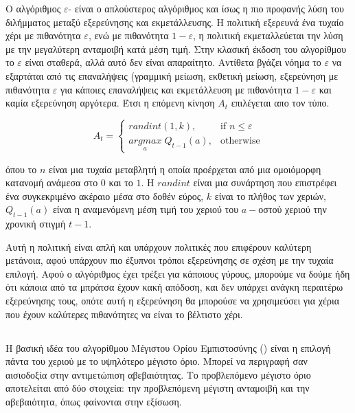 Ο αλγόριθμος $ε$- είναι ο απλούστερος αλγόριθμος και ίσως η πιο προφανής λύση του διλήμματος μεταξύ εξερεύνησης και εκμετάλλευσης. Η πολιτική εξερευνά ένα τυχαίο χέρι με πιθανότητα $ε$, ενώ με πιθανότητα $1-ε$, η πολιτική εκμεταλλεύεται την λύση με την μεγαλύτερη ανταμοιβή κατά μέση τιμή. Στην κλασική έκδοση του αλγορίθμου το $ε$ είναι σταθερά, αλλά αυτό δεν είναι απαραίτητο. Αντίθετα βγάζει νόημα το $ε$ να εξαρτάται από τις επαναλήψεις (γραμμική μείωση, εκθετική μείωση, εξερεύνηση με πιθανότητα $ε$ για κάποιες επαναλήψεις και εκμετάλλευση με πιθανότητα $1-ε$ και καμία εξερεύνηση αργότερα. Έτσι η επόμενη κίνηση $A_t$ επιλέγεται απο τον τύπο.

\begin{otherlanguage}{english}
    \begin{equation*}
        A_t = \begin{cases}
            randint(1,k),                     & \text{if } n \leq ε \\
            \underset{a}{argmax}\;Q_{t-1}(a), & \text{otherwise}
        \end{cases}
    \end{equation*}
\end{otherlanguage}

όπου το $n$ είναι μια τυχαία μεταβλητή η οποία προέρχεται από μια ομοιόμορφη κατανομή ανάμεσα στο $0$ και το $1$. Η $randint$ είναι μια συνάρτηση που επιστρέφει ένα συγκεκριμένο ακέραιο μέσα στο δοθέν εύρος, $k$ είναι το πλήθος των χεριών, $Q_{t-1}(a)$ είναι η αναμενόμενη μέση τιμή του χεριού του $a-$οστού χεριού την χρονική στιγμή $t-1$.

Αυτή η πολιτική είναι απλή και υπάρχουν πολιτικές που επιφέρουν καλύτερη μετάνοια, αφού υπάρχουν πιο έξυπνοι τρόποι εξερεύνησης σε σχέση με την τυχαία επιλογή. Αφού ο αλγόριθμος έχει τρέξει για κάποιους γύρους, μπορούμε να δούμε ήδη ότι κάποια από τα μπράτσα έχουν κακή απόδοση, και δεν υπάρχει ανάγκη περαιτέρω εξερεύνησης τους, οπότε αυτή η εξερεύνηση θα μπορούσε να χρησιμεύσει για χέρια που έχουν καλύτερες πιθανότητες να είναι το βέλτιστο χέρι.

\subsection{}

Η βασική ιδέα του αλγορίθμου Μέγιστου Ορίου Εμπιστοσύνης () είναι η επιλογή πάντα του χεριού με το υψηλότερο μέγιστο όριο. Μπορεί να περιγραφή σαν αισιοδοξία στην αντιμετώπιση αβεβαιότητας. Το προβλεπόμενο μέγιστο όριο αποτελείται από δύο στοιχεία: την προβλεπόμενη μέγιστη ανταμοιβή και την αβεβαιότητα, όπως φαίνονται στην εξίσωση.

